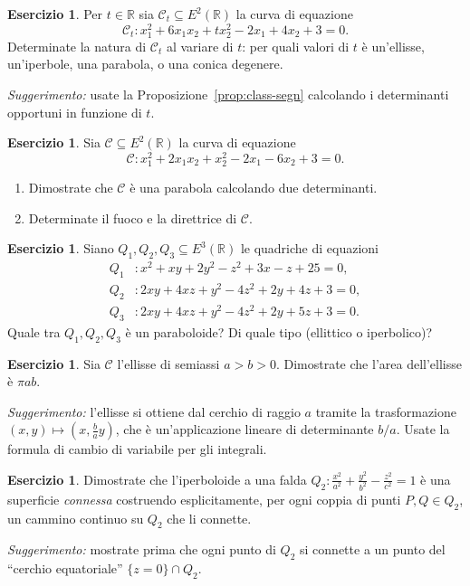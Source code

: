 \documentclass[11pt, a4paper]{book}
\theoremstyle{definition}
\newtheorem{esercizio}[definizione]{Esercizio}
\theoremstyle{plain}
\theoremstyle{remark}
\newcommand{\R}{\mathbb{R}}
\begin{document}
\begin{esercizio}
Per $t \in \R$ sia $\mathcal{C}_t \subseteq E^2(\R)$ la curva di equazione
\[
  \mathcal{C}_t \colon x_1^2 + 6x_1 x_2 + t x_2^2 - 2x_1 + 4x_2 + 3 = 0.
\]
Determinate la natura di $\mathcal{C}_t$ al variare di $t$: per quali valori di $t$ è un'ellisse, un'iperbole, una parabola, o una conica degenere.

\emph{Suggerimento:} usate la Proposizione~\ref{prop:class-segn} calcolando i determinanti opportuni in funzione di $t$.
\end{esercizio}

\begin{esercizio}
Sia $\mathcal{C} \subseteq E^2(\R)$ la curva di equazione
\[
  \mathcal{C} \colon x_1^2 + 2x_1 x_2 + x_2^2 - 2x_1 - 6x_2 + 3 = 0.
\]
\begin{enumerate}[label=(\alph*)]
  \item Dimostrate che $\mathcal{C}$ è una parabola calcolando due determinanti.
  \item Determinate il fuoco e la direttrice di $\mathcal{C}$.
\end{enumerate}
\end{esercizio}

\begin{esercizio}
Siano $Q_1, Q_2, Q_3 \subseteq E^3(\R)$ le quadriche di equazioni
\begin{align*}
  Q_1 &\colon x^2 + xy + 2y^2 - z^2 + 3x - z + 25 = 0, \\
  Q_2 &\colon 2xy + 4xz + y^2 - 4z^2 + 2y + 4z + 3 = 0, \\
  Q_3 &\colon 2xy + 4xz + y^2 - 4z^2 + 2y + 5z + 3 = 0.
\end{align*}
Quale tra $Q_1, Q_2, Q_3$ è un paraboloide? Di quale tipo (ellittico o iperbolico)?
\end{esercizio}

\begin{esercizio}
Sia $\mathcal{C}$ l'ellisse di semiassi $a > b > 0$. Dimostrate che l'area dell'ellisse è $\pi ab$.

\emph{Suggerimento:} l'ellisse si ottiene dal cerchio di raggio $a$ tramite la trasformazione $(x,y) \mapsto (x, \frac{b}{a}y)$, che è un'applicazione lineare di determinante $b/a$. Usate la formula di cambio di variabile per gli integrali.
\end{esercizio}

\begin{esercizio}
Dimostrate che l'iperboloide a una falda $Q_2 \colon \frac{x^2}{a^2}+\frac{y^2}{b^2}-\frac{z^2}{c^2}=1$ è una superficie \emph{connessa} costruendo esplicitamente, per ogni coppia di punti $P, Q \in Q_2$, un cammino continuo su $Q_2$ che li connette.

\emph{Suggerimento:} mostrate prima che ogni punto di $Q_2$ si connette a un punto del ``cerchio equatoriale'' $\{z=0\} \cap Q_2$.
\end{esercizio}
\end{document}
